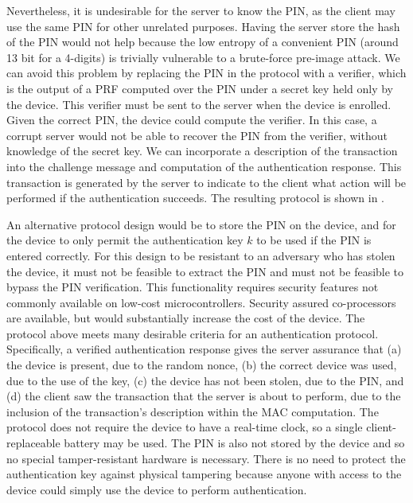 Nevertheless, it is undesirable for the server to know the PIN, as the client may
use the same PIN for other unrelated purposes. Having the server store
the hash of the PIN would not help because the low entropy of a
convenient PIN (around 13 bit for a 4-digits) is trivially vulnerable to
a brute-force pre-image attack. We can avoid this problem by replacing
the PIN in the protocol with a verifier, which is the output of a PRF computed over the PIN
under a secret key held only by the device. This
verifier must be sent to the server when the device is enrolled. Given
the correct PIN, the device could compute the verifier. In this case, a corrupt server
would not be able to recover the PIN from the verifier, without
knowledge of the secret key.
%
 We can incorporate a description of the transaction into the challenge
message and computation of the authentication response. This transaction
is generated by the server to indicate to the client what action will be
performed if the authentication succeeds. The resulting protocol is shown in 
.



An alternative protocol design would be to store the PIN on the device,
and for the device to only permit the authentication key $k$ to be used if
the PIN is entered correctly. For this design to be
resistant to an adversary who has stolen the device, it must not be feasible to extract the PIN and  must not be feasible to bypass the PIN verification. This functionality requires security features not commonly
available on low-cost microcontrollers. Security assured co-processors
are available, but would substantially increase the cost of the device. %
%
The protocol above meets many desirable criteria for an authentication
protocol. Specifically, a verified authentication response gives the server assurance that (a)
 the device is present, due to the random nonce, (b)
 the correct device was used, due to the use of the key, (c) the device has
not been stolen, due to the PIN, and (d) the client saw the transaction that
the server is about to perform, due to the inclusion of the transaction's description within the MAC computation. The protocol does not require
the device to have a real-time clock, so a single client-replaceable battery may be used. The PIN is also not stored by the device and so no
special tamper-resistant hardware is necessary. There is no need to
protect the authentication key against physical tampering because anyone
with access to the device could simply use the device to perform
authentication.

